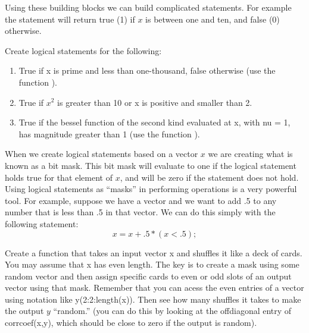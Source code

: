 Using these building blocks we can build complicated statements. For example the statement  will return true (1) if $x$ is between one and ten, and false (0) otherwise.

\begin{problem}
Create logical statements for the following:
\begin{enumerate}
\item True if x is prime and less than one-thousand, false otherwise (use the function ).
\item True if $x^2$ is greater than 10 or x is positive and smaller than 2.
\item True if the bessel function of the second kind evaluated at x, with nu = 1, has magnitude greater than 1 (use the function ).
\end{enumerate}
\end{problem}


When we create logical statements based on a vector $x$ we are creating what is known as a bit mask. This bit mask will evaluate to one if the logical statement holds true for that element of $x$, and will be zero if the statement does not hold. Using logical statements as ``masks'' in performing operations is a very powerful tool. For example, suppose we have a vector and we want to add .5 to any number that is less than .5 in that vector. We can do this simply with the following statement:
\[
x = x + .5*(x < .5);
\]

\begin{problem}
Create a function that takes an input vector x and shuffles it like a deck of cards. You may assume that x has even length. The key is to create a mask using some random vector and then assign specific cards to even or odd slots of an output vector using that mask. Remember that you can acess the even entries of a vector using notation like y(2:2:length(x)). Then see how many shuffles it takes to make the output $y$ ``random.'' (you can do this by looking at the offdiagonal entry of corrcoef(x,y), which should be close to zero if the output is random).
\end{problem}


